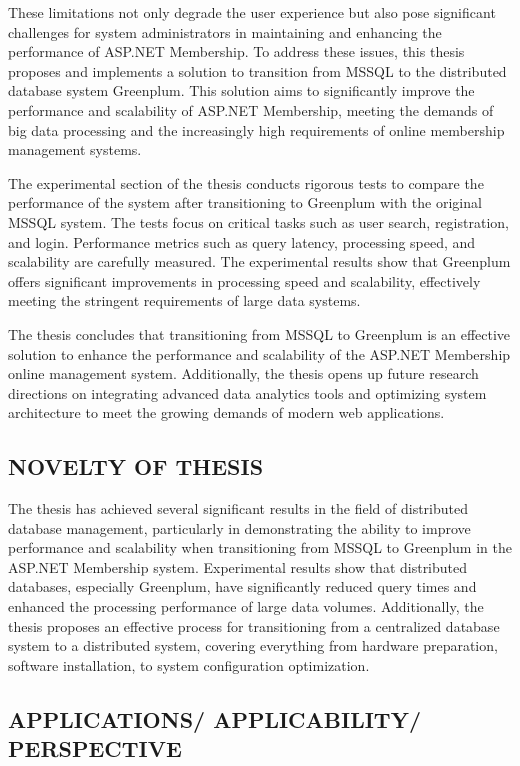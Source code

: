 \documentclass{article}[14pt]
\begin{document}
These limitations not only degrade the user experience but also pose significant challenges for system administrators in maintaining and enhancing the performance of ASP.NET Membership. To address these issues, this thesis proposes and implements a solution to transition from MSSQL to the distributed database system Greenplum. This solution aims to significantly improve the performance and scalability of ASP.NET Membership, meeting the demands of big data processing and the increasingly high requirements of online membership management systems.

The experimental section of the thesis conducts rigorous tests to compare the performance of the system after transitioning to Greenplum with the original MSSQL system. The tests focus on critical tasks such as user search, registration, and login. Performance metrics such as query latency, processing speed, and scalability are carefully measured. The experimental results show that Greenplum offers significant improvements in processing speed and scalability, effectively meeting the stringent requirements of large data systems.

The thesis concludes that transitioning from MSSQL to Greenplum is an effective solution to enhance the performance and scalability of the ASP.NET Membership online management system. Additionally, the thesis opens up future research directions on integrating advanced data analytics tools and optimizing system architecture to meet the growing demands of modern web applications.


\subsection{NOVELTY OF THESIS}
The thesis has achieved several significant results in the field of distributed database management, particularly in demonstrating the ability to improve performance and scalability when transitioning from MSSQL to Greenplum in the ASP.NET Membership system. Experimental results show that distributed databases, especially Greenplum, have significantly reduced query times and enhanced the processing performance of large data volumes. Additionally, the thesis proposes an effective process for transitioning from a centralized database system to a distributed system, covering everything from hardware preparation, software installation, to system configuration optimization.


\subsection{APPLICATIONS/ APPLICABILITY/ PERSPECTIVE}
\end{document}
